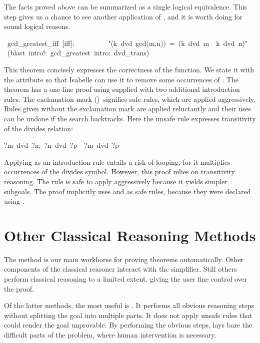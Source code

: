 The facts proved above can be summarized as a single logical 
equivalence.  This step gives us a chance to see another application
of , and it is worth doing for sound logical reasons.
\begin{isabelle}
\ gcd_greatest_iff\ [iff]:\isanewline
\ \ \ \ \ \ \ \ \ "(k\ dvd\ gcd(m,n))\ =\ (k\ dvd\ m\ \isasymand\ k\ dvd\
n)"\isanewline
{}\ (blast\ intro!:\ gcd_greatest\ intro:\ dvd_trans)
\end{isabelle}
This theorem concisely expresses the correctness of the  
function. 
We state it with the  attribute so that 
Isabelle can use it to remove some occurrences of . 
The theorem has a one-line 
proof using  supplied with two additional introduction 
rules. The exclamation mark 
({}{\isa{!}})\ signifies safe rules, which are 
applied aggressively.  Rules given without the exclamation mark 
are applied reluctantly and their uses can be undone if 
the search backtracks.  Here the unsafe rule expresses transitivity  
of the divides relation:
\begin{isabelle}
\isasymlbrakk?m\ dvd\ ?n;\ ?n\ dvd\ ?p\isasymrbrakk\ \isasymLongrightarrow\ ?m\ dvd\ ?p%
\rulename{dvd_trans}
\end{isabelle}
Applying  as 
an introduction rule entails a risk of looping, for it multiplies 
occurrences of the divides symbol. However, this proof relies 
on transitivity reasoning.  The rule {} is safe to apply 
aggressively because it yields simpler subgoals.  The proof implicitly
uses \isa{gcd_dvd1} and \isa{gcd_dvd2} as safe rules, because they were
declared using \isa{iff}.%


\section{Other Classical Reasoning Methods}
 
The  method is our main workhorse for proving theorems 
automatically. Other components of the classical reasoner interact 
with the simplifier. Still others perform classical reasoning 
to a limited extent, giving the user fine control over the proof. 

Of the latter methods, the most useful is 
.
It performs 
all obvious reasoning steps without splitting the goal into multiple 
parts. It does not apply unsafe rules that could render the 
goal unprovable. By performing the obvious 
steps,  lays bare the difficult parts of the problem, 
where human intervention is necessary. 

